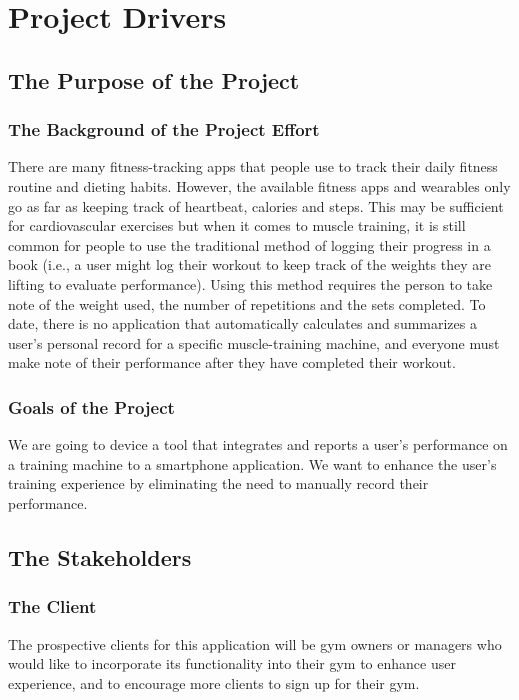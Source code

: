 \documentclass{article}
\begin{document}
\newpage

\clearpage
\setcounter{page}{1}

\section{Project Drivers}
\subsection{The Purpose of the Project}
\subsubsection{The Background of the Project Effort}
There are many fitness-tracking apps that people use to track their daily fitness routine and dieting habits. However, the available fitness apps and wearables only go as far as keeping track of heartbeat, calories and steps. This may be sufficient for cardiovascular exercises but when it comes to muscle training, it is still common for people to use the traditional method of logging their progress in a book (i.e., a user might log their workout to keep track of the weights they are lifting to evaluate performance). Using this method requires the person to take note of the weight used, the number of repetitions and the sets completed. To date, there is no application that automatically calculates and summarizes a user’s personal record for a specific muscle-training machine, and everyone must make note of their performance after they have completed their workout. 

\subsubsection{Goals of the Project}
We are going to device a tool that integrates and reports a user's performance on a training machine to a smartphone application. We want to enhance the user's training experience by eliminating the need to manually record their performance.

\subsection{The Stakeholders}
\subsubsection{The Client}
The prospective clients for this application will be gym owners or managers who would like to incorporate its functionality into their gym to enhance user experience, and to encourage more clients to sign up for their gym.
\end{document}
